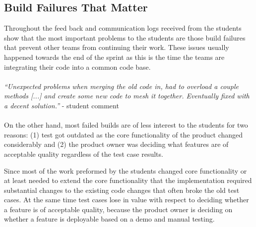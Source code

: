 \subsection{Build Failures That Matter}
Throughout the feed back and communication logs received from the students show that the most important problems to the students are those build failures that prevent other teams from continuing their work.
These issues usually happened towards the end of the sprint as this is the time the teams are integrating their code into a common code base.
\\ \ \\
\indent\emph{``Unexpected problems when merging the old code in, had to overload a couple methods [...]  and create some new code to mesh it together.  Eventually fixed with a decent solution.''} - student comment
\\ \ \\
\indent On the other hand, most failed builds are of less interest to the students for two reasons: 
(1) test got outdated as the core functionality of the product changed considerably 
and (2) the product owner was deciding what features are of acceptable quality regardless of the test case results.

Since most of the work preformed by the students changed core functionality or at least needed to extend the core functionality that the implementation required substantial changes to the existing code changes that often broke the old test cases.
At the same time test cases lose in value with respect to deciding whether a feature is of acceptable quality, because the product owner is deciding on whether a feature is deployable based on a demo and manual testing.

